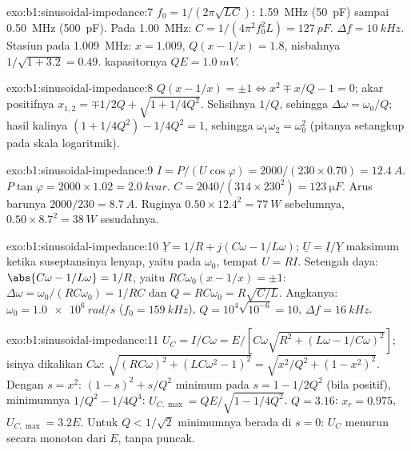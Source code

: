 \begin{solution}{exo:b1:sinusoidal-impedance:7}
$f_0 = 1/(2\pi\sqrt{LC})$: \qty{1.59}{MHz} (\qty{50}{pF}) sampai \qty{0.50}{MHz}
(\qty{500}{pF}). Pada \qty{1.00}{MHz}: $C = 1/(4\pi^2f_0^2L) = \qty{127}{pF}$.
$\Delta f = \qty{10}{kHz}$. Stasiun pada \qty{1.009}{MHz}: $x = 1.009$,
$Q(x - 1/x) = 1.8$, nisbahnya $1/\sqrt{1 + 3.2} = 0.49$. 
kapasitornya $QE = \qty{1.0}{mV}$.
\end{solution}

\begin{solution}{exo:b1:sinusoidal-impedance:8}
$Q(x - 1/x) = \pm1 \Leftrightarrow x^2 \mp x/Q - 1 = 0$; akar positifnya
$x_{1,2} = \mp 1/2Q + \sqrt{1 + 1/4Q^2}$. Selisihnya $1/Q$, sehingga
$\Delta\omega = \omega_0/Q$; hasil kalinya $(1 + 1/4Q^2) - 1/4Q^2 = 1$, sehingga
$\omega_1\omega_2 = \omega_0^2$ (pitanya setangkup pada skala logaritmik).
\end{solution}

\begin{solution}{exo:b1:sinusoidal-impedance:9}
$I = P/(U\cos\varphi) = 2000/(230 \times 0.70) = \qty{12.4}{A}$.  $P\tan\varphi = 2000 \times 1.02 = \qty{2.0}{kvar}$. $C = 2040/(314
\times 230^2) = \qty{123}{\micro F}$. Arus barunya $2000/230 = \qty{8.7}{A}$.
Ruginya $0.50 \times 12.4^2 = \qty{77}{W}$ sebelumnya, $0.50 \times 8.7^2 =
\qty{38}{W}$ sesudahnya.
\end{solution}

\begin{solution}{exo:b1:sinusoidal-impedance:10}
$\underline Y = 1/R + j(C\omega - 1/L\omega)$; $\underline U = \underline I/
\underline Y$ maksimum ketika suseptansinya lenyap, yaitu pada $\omega_0$,
tempat $U = RI$. Setengah daya: $\abs{C\omega - 1/L\omega} = 1/R$, yaitu
$RC\omega_0(x - 1/x) = \pm1$: $\Delta\omega = \omega_0/(RC\omega_0) = 1/RC$
dan $Q = RC\omega_0 = R\sqrt{C/L}$. Angkanya: $\omega_0 = \qty{1.0e6}{rad/s}$
($f_0 = \qty{159}{kHz}$), $Q = 10^4\sqrt{10^{-6}} = 10$, $\Delta f =
\qty{16}{kHz}$.
\end{solution}

\begin{solution}{exo:b1:sinusoidal-impedance:11}
$U_C = I/C\omega = E/[C\omega\sqrt{R^2 + (L\omega - 1/C\omega)^2}]$;
isinya dikalikan $C\omega$: $\sqrt{(RC\omega)^2 + (LC\omega^2 - 1)^2} =
\sqrt{x^2/Q^2 + (1 - x^2)^2}$. Dengan $s = x^2$: $(1 - s)^2 + s/Q^2$
minimum pada $s = 1 - 1/2Q^2$ (bila positif), minimumnya $1/Q^2 - 1/4Q^4$:
$U_{C,\max} = QE/\sqrt{1 - 1/4Q^2}$. $Q = 3.16$: $x_r = 0.975$,
$U_{C,\max} = 3.2E$. Untuk $Q < 1/\sqrt2$ minimumnya berada di $s = 0$: $U_C$
menurun secara monoton dari $E$, tanpa puncak.
\end{solution}

